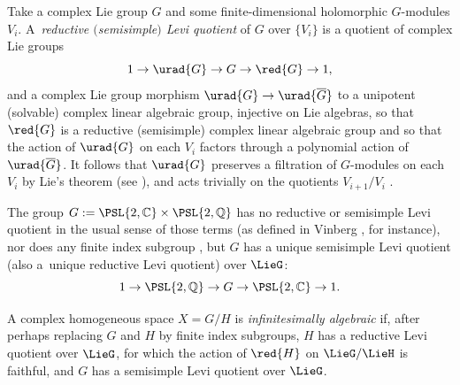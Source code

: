 \documentclass[pdftex]{sigma}
\numberwithin{equation}{section}
\renewcommand{\C}{\mathbb{C}}
\newcommand{\Q}{\mathbb{Q}}
\begin{document}
Take a complex Lie group $G$ and some finite-dimensional holomorphic $G$-modules $V_i$.
A~\emph{reductive $($semisimple$)$ Levi quotient} of $G$ over $\{V_i\}$ is a quotient of complex Lie groups
\[
1 \to \urad{G} \to G \to \red{G} \to 1,
\]
and a complex Lie group morphism $\urad{G} \to \urad{\overline{G}}$ to a unipotent (solvable) complex
linear algebraic group, injective on Lie algebras, so that $\red{G}$ is a reductive (semisimple) complex
linear algebraic group and so that the action of $\urad{G}$ on each $V_i$ factors through a polynomial
action of $\urad{\overline{G}}$.
It follows that $\urad{G}$ preserves a filtration of $G$-modules on each $V_i$ by Lie's theorem
(see \cite[Theorem~3]{Serre:2001}), and acts trivially on the quotients $V_{i+1}/V_i$
\cite[Section 4.8]{Borel:1991}.
\begin{Example}

The group $G := \PSL{2,\C} \times \PSL{2,\Q{}}$ has no reductive or semisimple Levi quotient in the
usual sense of those terms (as defined in Vinberg \cite[p.~20]{Vinberg:1994}, for instance), nor does any finite index
subgroup \cite[Theorem 6.14]{Jacobson:1985}, but $G$ has a unique semisimple Levi quotient (also a~unique reductive Levi quotient) over $\LieG$:
\[
1 \to \PSL{2,\Q{}} \to G \to \PSL{2,\C} \to 1.
\]
\end{Example}
A complex homogeneous space $X=G/H$ is \emph{infinitesimally algebraic} if, after perhaps replacing $G$ and $H$ by finite index subgroups, $H$ has a reductive Levi quotient over $\LieG$, for which the action of $\red{H}$ on $\LieG/\LieH$ is faithful, and $G$ has a semisimple Levi quotient over $\LieG$.
\end{document}

